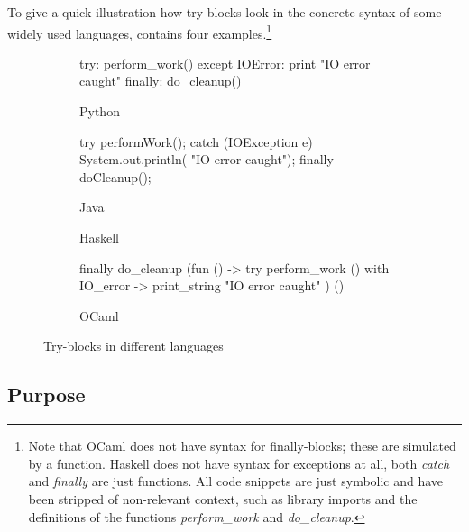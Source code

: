 To give a quick illustration how try-blocks look in the concrete syntax of some widely used
languages,  contains four examples.\footnote{Note that OCaml does not
have syntax for finally-blocks; these are simulated by a function. Haskell does not have
syntax for exceptions at all, both \emph{catch} and \emph{finally} are just functions.
All code snippets are just symbolic and have been stripped of non-relevant context, such
as library imports and the definitions of the functions \emph{perform\_work}
and \emph{do\_cleanup}.}
%
\begin{figure}
\centering
\begin{subfigure}[t]{0.46\textwidth}\begin{codepy}
try:
	perform_work()
except IOError:
	print "IO error caught"
finally:
	do_cleanup()
\end{codepy}\vspace{2\baselineskip}\caption{Python}\end{subfigure}
%
\begin{subfigure}[t]{0.46\textwidth}\begin{codejava}
try {
	performWork();
} catch (IOException e) {
	System.out.println(
	    "IO error caught");
} finally {
	doCleanup();
}
\end{codejava}\caption{Java}\end{subfigure}

\begin{subfigure}[t]{0.46\textwidth}\caption{Haskell}\end{subfigure}
%
\begin{subfigure}[t]{0.46\textwidth}\begin{codeml}
finally do_cleanup (fun () ->
  try perform_work ()
  with IO_error ->
    print_string "IO error caught"
) ()
\end{codeml}\caption{OCaml}\end{subfigure}

\caption{Try-blocks in different languages}
\label{fig:try-blocks}
\end{figure}


\subsection{Purpose}

